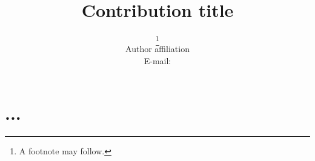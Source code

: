 \documentclass{PoS}
\title{Contribution title}
\author{\speaker{First Author}\thanks{A footnote may follow.}\\
        Author affiliation\\
        E-mail: \email{author@email}}
\begin{document}
\section{...}

\end{document}
